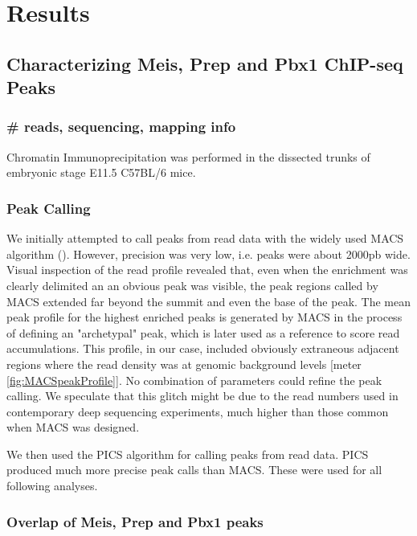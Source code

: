 \chapter{Results}
\label{chp:results}

\section{Characterizing Meis, Prep and Pbx1 ChIP-seq Peaks}

\subsection{\# reads, sequencing, mapping info}
Chromatin Immunoprecipitation was performed in the dissected trunks of embryonic stage E11.5 C57BL/6 mice.

\subsection{Peak Calling}

We initially attempted to call peaks from read data with the widely used \ac{MACS} algorithm (\cite{MACS ref}). However, precision was very low, i.e. peaks were about 2000pb wide. Visual inspection of the read profile revealed that, even when the enrichment was clearly delimited an an obvious peak was visible, the peak regions called by \ac{MACS} extended far beyond the summit and even the base of the peak. The mean peak profile for the highest enriched peaks is generated by \ac{MACS} in the process of defining an "archetypal" peak, which is later used as a reference to score read accumulations. This profile, in our case, included obviously extraneous adjacent regions where the read density was at genomic background levels [meter \ref{fig:MACSpeakProfile}]. No combination of parameters could refine the peak calling. We speculate that this glitch might be due to the read numbers used in contemporary deep sequencing experiments, much higher than those common when \ac{MACS} was designed.

We then used the \ac{PICS} algorithm \cite{ref} for calling peaks from read data. \ac{PICS} produced much more precise peak calls than \ac{MACS}. These were used for all following analyses.

\subsection{Overlap of Meis, Prep and Pbx1 peaks}

